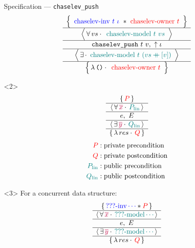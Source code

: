 \begin{frame}{Specification --- \texttt{chaselev\_push}}
\centering
\[
	\atripleExtPretty{
		\tikz[baseline, remember picture]{\node[anchor=base] (inv_1) {${
			\textcolor{blue}{\mathrm{chaselev \mathhyphen inv}\ t\ \iota}
		}$}} \iSep
		\tikz[baseline, remember picture]{\node[anchor=base] (owner_1) {${
			\textcolor{red}{\mathrm{chaselev \mathhyphen owner}\ t}
		}$}}
	}{
		vs
	}{
		\tikz[baseline, remember picture]{\node[anchor=base] (model_1) {${
			\textcolor{teal}{\mathrm{chaselev \mathhyphen model}\ t\ vs}
		}$}}
	}{
		\texttt{chaselev\_push}\ t\ v
	}{
		\uparrow\iota
	}{
	}{
		\tikz[baseline, remember picture]{\node[anchor=base] (model_2) {${
			\textcolor{teal}{\mathrm{chaselev \mathhyphen model}\ t\ (vs \mdoubleplus [v])}
		}$}}
	}{
		\exprUnit
	}{
		\tikz[baseline, remember picture]{\node[anchor=base] (owner_2) {${
			\textcolor{red}{\mathrm{chaselev \mathhyphen owner}\ t}
		}$}}
	}
\]
\begin{overbox}<2>
	\[
		\atripleExtPretty{
			\textcolor{red}{P}
		}{
			\textcolor{purple}{\overline{x}}
		}{
			\textcolor{teal}{P_\mathrm{lin}}
		}{
			e
		}{
			E
		}{
			\textcolor{purple}{\overline{y}}
		}{
			\textcolor{teal}{Q_\mathrm{lin}}
		}{
			res
		}{
			\textcolor{red}{Q}
		}
	\]
	\begin{align*}
			\textcolor{red}{P}
			&:
			\text{private precondition}
		\\
			\textcolor{red}{Q}
			&:
			\text{private postcondition}
		\\
			\textcolor{teal}{P_\mathrm{lin}}
			&:
			\text{public precondition}
		\\
			\textcolor{teal}{Q_\mathrm{lin}}
			&:
			\text{public postcondition}
	\end{align*}
\end{overbox}
\begin{overbox}<3>
	For a concurrent data structure:
	\[
		\atripleExtPretty{
			\textcolor{blue}{\mathrm{??? \mathhyphen inv} \cdots} \iSep
			\textcolor{red}{P}
		}{
			\textcolor{purple}{\overline{x}}
		}{
			\textcolor{teal}{\mathrm{??? \mathhyphen model} \cdots}
		}{
			e
		}{
			E
		}{
			\textcolor{purple}{\overline{y}}
		}{
			\textcolor{teal}{\mathrm{??? \mathhyphen model} \cdots}
		}{
			res
		}{
			\textcolor{red}{Q}
		}
	\]
\end{overbox}
\vfill
{}
\end{frame}

